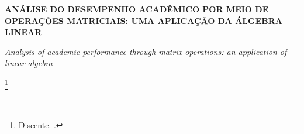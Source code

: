 \documentclass[12pt,a4paper]{article}
\begin{document}
\thispagestyle{fancy}
\begin{center}
\begin{singlespace}
{\bfseries\large ANÁLISE DO DESEMPENHO ACADÊMICO POR MEIO DE OPERAÇÕES MATRICIAIS: UMA APLICAÇÃO DA ÁLGEBRA LINEAR\par}
\vspace{4pt}
{\itshape Analysis of academic performance through matrix operations: an application of linear algebra\par}
\vspace{10pt}
\IntegranteUm\footnote{Discente. \Instituicao.}\\
\IntegranteDois\footnotemark[1]\\
\IntegranteTres\footnotemark[1]\par
\end{singlespace}
\end{center}
\end{document}
